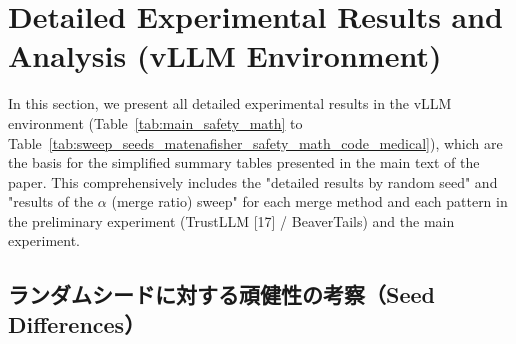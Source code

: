 \documentclass{article}
\begin{document}
\FloatBarrier

\section{Detailed Experimental Results and Analysis (vLLM Environment)}
\label{sec:appendix_detailed_results}


In this section, we present all detailed experimental results in the vLLM environment (Table~\ref{tab:main_safety_math} to Table~\ref{tab:sweep_seeds_matenafisher_safety_math_code_medical}), which are the basis for the simplified summary tables presented in the main text of the paper. This comprehensively includes the "detailed results by random seed" and "results of the $\alpha$ (merge ratio) sweep" for each merge method and each pattern in the preliminary experiment (TrustLLM [17] / BeaverTails) and the main experiment.

\subsection{ランダムシードに対する頑健性の考察（Seed Differences）}

\end{document}

